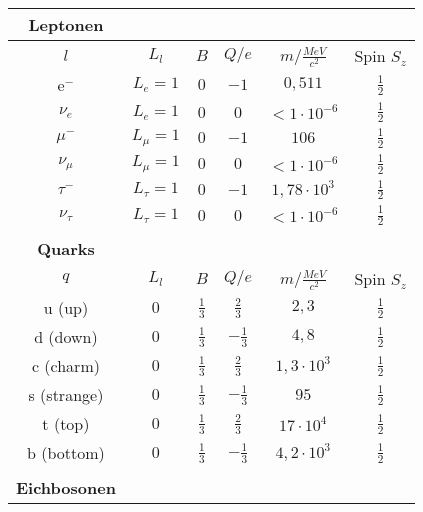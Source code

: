 \begin{table}[htbp]
		\centering
		\begin{tabular*}{\linewidth}{@{\extracolsep{\fill}}cccccc}
		\hline
		\hline
		\rule[-6pt]{0pt}{21pt}\textbf{Leptonen}  & & & &
		\\
		\hline
		\rule[-7pt]{0pt}{23pt} $l$ & $L_l$ & $B$ & $Q/e$ & $m$/$\frac{MeV}{c^2}$ & Spin $S_z$
		\\
		\hline
		\rule[-6pt]{0pt}{21pt} e$^-$ & \(L_e=1\) & $0$ & $-1$ & $0,511$ & $\frac{1}{2}$
		\\
		\rule[-6pt]{0pt}{21pt}$\nu_e$&  \(L_e=1\)	& $0$ & $0$ & $<1\cdot10^{-6}$ & $\frac{1}{2}$
		\\
		\rule[-6pt]{0pt}{21pt} $\mu^-$ & \(L_{\mu}=1\) & $0$ & $-1$ & $106$ & $\frac{1}{2}$
		\\
		\rule[-6pt]{0pt}{21pt}$\nu_{\mu}$ &  \(L_{\mu}=1\)	& $0$ & $0$ & $<1\cdot10^{-6}$ & $\frac{1}{2}$
		\\
		\rule[-6pt]{0pt}{21pt} $\tau^-$ & \(L_{\tau}=1\) & $0$ & $-1$ & $1,78\cdot10^3$ & $\frac{1}{2}$
		\\
		\rule[-6pt]{0pt}{21pt}$\nu_{\tau}$&  \(L_{\tau}=1\)	& $0$ & $0$ & $<1\cdot10^{-6}$ & $\frac{1}{2}$
		\\
		\rule[-6pt]{0pt}{21pt}  & & & &
		\\
		\rule[-6pt]{0pt}{21pt}\textbf{Quarks}  & & & &
		\\
		\hline
		\rule[-7pt]{0pt}{23pt} $q$ & \(L_l\) & $B$ & $Q/e$ & $m$/$\frac{MeV}{c^2}$ & Spin $S_z$
		\\
		\hline
		\rule[-6pt]{0pt}{21pt} u (up) &  $0$	& $\frac{1}{3}$ & $\frac{2}{3}$ & $2,3$ & $\frac{1}{2}$
		\\
		\rule[-6pt]{0pt}{21pt} d (down) &  $0$	& $\frac{1}{3}$ & $-\frac{1}{3}$ & $4,8$ & $\frac{1}{2}$
		\\
		\rule[-6pt]{0pt}{21pt} c (charm) &  $0$	& $\frac{1}{3}$ & $\frac{2}{3}$ & $1,3\cdot10^3$ & $\frac{1}{2}$
		\\
		\rule[-6pt]{0pt}{21pt} s (strange) &  $0$	& $\frac{1}{3}$ & $-\frac{1}{3}$ & $95$ & $\frac{1}{2}$
		\\
		\rule[-6pt]{0pt}{21pt} t (top) &  $0$	& $\frac{1}{3}$ & $\frac{2}{3}$ & $17\cdot10^{4}$ & $\frac{1}{2}$
		\\
		\rule[-6pt]{0pt}{21pt} b (bottom) &  $0$	& $\frac{1}{3}$ & $-\frac{1}{3}$ & $4,2\cdot10^{3}$ & $\frac{1}{2}$
		\\
		\rule[-6pt]{0pt}{21pt}  & & & &
		\\
		\rule[-6pt]{0pt}{21pt} \textbf{Eichbosonen} & & & &

\end{tabular*}
\end{table}

